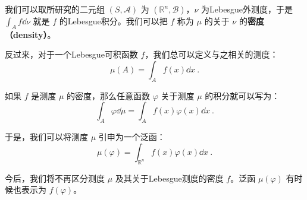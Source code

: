 我们可以取所研究的二元组 $(S, \mathcal{A})$ 为 $(\mathbb{R}^n, \mathcal{B})$，$\nu$ 为Lebesgue外测度，于是 $\int_A f \dd \nu$ 就是 $f$ 的Lebesgue积分。我们可以把 $f$ 称为 $\mu$ 的关于 $\nu$ 的\textbf{密度（density）}。

反过来，对于一个Lebesgue可积函数 $f$，我们总可以定义与之相关的测度：
\begin{equation}
\mu(A) = \int_A f(x) \dd x~.
\end{equation}

如果 $f$ 是测度 $\mu$ 的密度，那么任意函数 $\varphi$ 关于测度 $\mu$ 的积分就可以写为：
\begin{equation}
\int_A \varphi \dd \mu = \int_A f(x)\varphi(x) \dd x~.
\end{equation}

于是，我们可以将测度 $\mu$ 引申为一个泛函：
\begin{equation}
\mu(\varphi) = \int_{\mathbb{R}^n} f(x)\varphi(x) \dd x~.
\end{equation}

今后，我们将不再区分测度 $\mu$ 及其关于Lebesgue测度的密度 $f$。泛函 $\mu(\varphi)$ 有时候也表示为 $f(\varphi)$。











